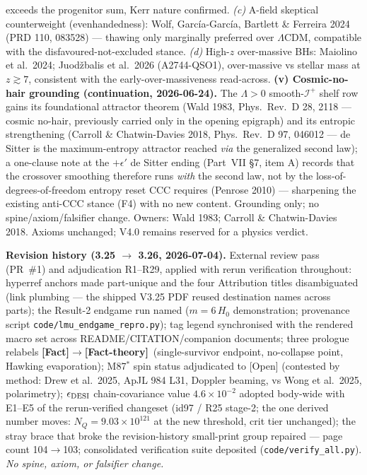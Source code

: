 \documentclass[11pt]{article}
\newcommand{\Fact}{\textbf{\textcolor{green!45!black}{[Fact]}}}
\newcommand{\factth}{\textcolor{green!40!black}{\textbf{[Fact-theory]}}}
\begin{document}
{exceeds the progenitor sum, Kerr nature confirmed. \emph{(c)} A-field skeptical counterweight (evenhandedness): Wolf, Garc\'ia-Garc\'ia, Bartlett \& Ferreira 2024 (PRD 110, 083528) --- thawing only marginally preferred over $\Lambda$CDM, compatible with the disfavoured-not-excluded stance. \emph{(d)} High-$z$ over-massive BHs: Maiolino et al.\ 2024; Juod\v{z}balis et al.\ 2026 (A2744-QSO1), over-massive vs stellar mass at $z\gtrsim7$, consistent with the early-over-massiveness read-across. \textbf{(v) Cosmic-no-hair grounding (continuation, 2026-06-24).} The $\Lambda>0$ smooth-$\mathscr I^+$ shelf row gains its foundational attractor theorem (Wald 1983, Phys.\ Rev.\ D 28, 2118 --- cosmic no-hair, previously carried only in the opening epigraph) and its entropic strengthening (Carroll \& Chatwin-Davies 2018, Phys.\ Rev.\ D 97, 046012 --- de Sitter is the maximum-entropy attractor reached \emph{via} the generalized second law); a one-clause note at the $+\epsilon'$ de Sitter ending (Part~VII \S7, item A) records that the crossover smoothing therefore runs \emph{with} the second law, not by the loss-of-degrees-of-freedom entropy reset CCC requires (Penrose 2010) --- sharpening the existing anti-CCC stance (F4) with no new content. Grounding only; no spine/axiom/falsifier change. Owners: Wald 1983; Carroll \& Chatwin-Davies 2018. Axioms unchanged; V4.0 remains reserved for a physics verdict.

\smallskip\noindent\textbf{Revision history (3.25 $\to$ 3.26, 2026-07-04).} External review pass (PR~\#1) and adjudication R1--R29, applied with rerun verification throughout: hyperref anchors made part-unique and the four Attribution titles disambiguated (link plumbing --- the shipped V3.25 PDF reused destination names across parts); the Result-2 endgame run named ($m{=}6\,H_0$ demonstration; provenance script \texttt{code/lmu\_endgame\_repro.py}); tag legend synchronised with the rendered macro set across README/CITATION/companion documents; three prologue relabels \Fact$\to$\factth\ (single-survivor endpoint, no-collapse point, Hawking evaporation); M87$^*$ spin status adjudicated to [Open] (contested by method: Drew et al.\ 2025, ApJL 984 L31, Doppler beaming, vs Wong et al.\ 2025, polarimetry); $\epsilon_{\rm DESI}$ chain-covariance value $4.6\times10^{-2}$ adopted body-wide with E1--E5 of the rerun-verified changeset (id97 / R25 stage-2; the one derived number moves: $N_Q=9.03\times10^{121}$ at the new threshold, crit tier unchanged); the stray brace that broke the revision-history small-print group repaired --- page count 104$\to$103; consolidated verification suite deposited (\texttt{code/verify\_all.py}). \emph{No spine, axiom, or falsifier change.}

}
\end{document}
